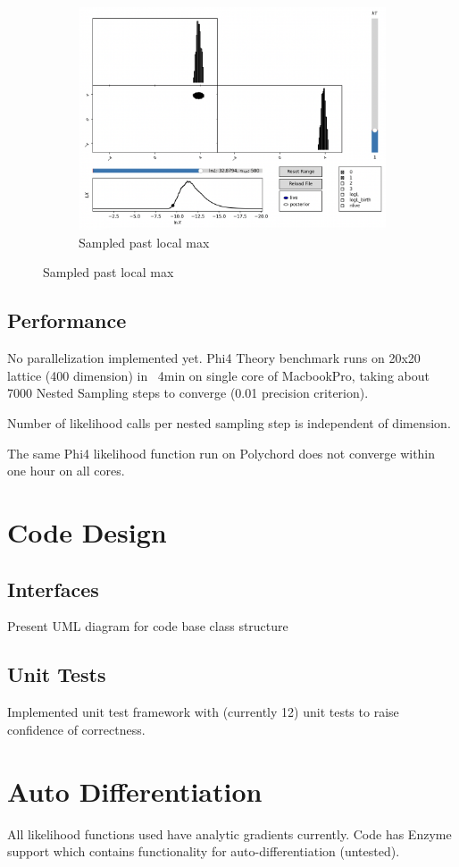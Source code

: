 \documentclass[11pt]{article}
\begin{document}
\begin{figure}[H]
\begin{subfigure}[b]{0.3\linewidth}
            \centering
            \includegraphics[width=\linewidth]{../figures/topotrap/NS3}
            \caption{Sampled past local max}
        \end{subfigure}
        \label{dig:topotrap_ns}
    \end{figure}


    \subsection{Performance}
    No parallelization implemented yet.
    Phi4 Theory benchmark runs on 20x20 lattice (400 dimension) in ~4min on single core of MacbookPro,
    taking about 7000 Nested Sampling steps to converge (0.01 precision criterion).

    Number of likelihood calls per nested sampling step is independent of dimension.

    The same Phi4 likelihood function run on Polychord does not converge within one hour on all cores.

    \newpage
    \appendix
    \section{Code Design}
    \subsection{Interfaces}
    Present UML diagram for code base class structure
    \subsection{Unit Tests}
    Implemented unit test framework with (currently 12) unit tests to raise confidence of correctness.
    \section{Auto Differentiation}
    All likelihood functions used have analytic gradients currently. Code has Enzyme support which contains
    functionality for auto-differentiation (untested).


\printbibliography
\end{document}
